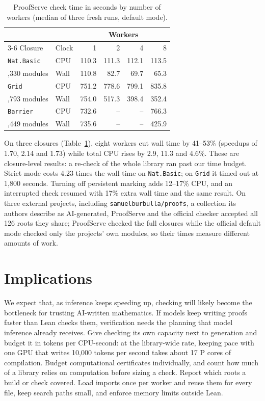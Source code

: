 \documentclass[10pt,twocolumn]{article}
\begin{document}
\begin{table}[t]
\centering
\small
\setlength{\tabcolsep}{4pt}
\begin{tabular}{llrrrr}
\toprule
& & \multicolumn{4}{c}{Workers}\\
\cmidrule(l){3-6}
Closure & Clock & 1 & 2 & 4 & 8\\
\midrule
\texttt{Nat.Basic} & CPU & 110.3 & 111.3 & 112.1 & 113.5\\
\quad 1,330 modules & Wall & 110.8 & 82.7 & 69.7 & 65.3\\
\texttt{Grid} & CPU & 751.2 & 778.6 & 799.1 & 835.8\\
\quad 3,793 modules & Wall & 754.0 & 517.3 & 398.4 & 352.4\\
\texttt{Barrier} & CPU & 732.6 & -- & -- & 766.3\\
\quad 4,449 modules & Wall & 735.6 & -- & -- & 425.9\\
\bottomrule
\end{tabular}
\caption{ProofServe check time in seconds by number of workers (median of
three fresh runs, default mode).}
\label{tab:scaling}
\end{table}

On three closures (Table~\ref{tab:scaling}), eight workers cut wall time
by 41--53\% (speedups of 1.70, 2.14 and 1.73) while total CPU rises by 2.9,
11.3 and 4.6\%. These are closure-level results: a re-check of the whole
library ran past our time budget. Strict mode costs 4.23 times the wall time on \texttt{Nat.Basic};
on \texttt{Grid} it timed out at 1,800 seconds. Turning off persistent
marking adds 12--17\% CPU, and an interrupted check resumed with 17\% extra
wall time and the same result. On three external projects, including
\texttt{samuelburbulla/proofs}, a collection its authors describe as
AI-generated, ProofServe and the official checker accepted all 126 roots
they share; ProofServe checked the full closures while the official
default mode checked only the projects' own modules, so their times
measure different amounts of work.

\section{Implications}\label{sec:implications}
We expect that, as inference keeps speeding up, checking will likely become
the bottleneck for trusting AI-written mathematics.
If models keep writing proofs faster than Lean checks them, verification
needs the planning that model inference already receives. Give checking
its own capacity next to generation and budget it in tokens per
CPU-second: at the library-wide rate, keeping pace with one GPU that writes
10,000 tokens per second takes about 17 P cores of compilation.
Budget computational certificates individually, and count how much of a
library relies on computation before sizing a check. Report which roots a
build or check covered. Load imports once per worker and reuse them for
every file, keep search paths small, and enforce memory limits outside Lean.
\end{document}
